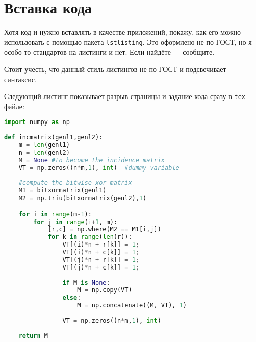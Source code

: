 \section{Вставка кода}

Хотя код и нужно вставлять в качестве приложений, покажу, как его можно использовать с помощью пакета \texttt{lstlisting}. Это оформлено не по ГОСТ, но я особо-то стандартов на листинги и нет. Если найдёте --- сообщите.


Стоит учесть, что данный стиль листингов не по ГОСТ и подсвечивает синтаксис.

Следующий листинг показывает разрыв страницы и задание кода сразу в \texttt{tex}-файле:

\begin{lstlisting}[frame=rlbt,language=Python,caption={Длинный листинг}]
import numpy as np
    
def incmatrix(genl1,genl2):
    m = len(genl1)
    n = len(genl2)
    M = None #to become the incidence matrix
    VT = np.zeros((n*m,1), int)  #dummy variable
    
    #compute the bitwise xor matrix
    M1 = bitxormatrix(genl1)
    M2 = np.triu(bitxormatrix(genl2),1) 

    for i in range(m-1):
        for j in range(i+1, m):
            [r,c] = np.where(M2 == M1[i,j])
            for k in range(len(r)):
                VT[(i)*n + r[k]] = 1;
                VT[(i)*n + c[k]] = 1;
                VT[(j)*n + r[k]] = 1;
                VT[(j)*n + c[k]] = 1;
                
                if M is None:
                    M = np.copy(VT)
                else:
                    M = np.concatenate((M, VT), 1)
                
                VT = np.zeros((n*m,1), int)
    
    return M
\end{lstlisting}